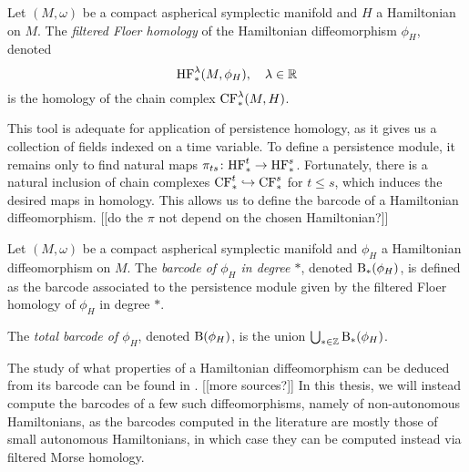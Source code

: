 \begin{definition}
Let $(M,\omega)$ be a compact aspherical symplectic manifold and $H$ a Hamiltonian on $M$. The \emph{filtered Floer homology} of the Hamiltonian diffeomorphism $\phi_H$, denoted
\begin{equation}
\mathrm{HF}^\lambda_*(M,\phi_H), \quad \lambda \in \mathbb{R}
\end{equation}
is the homology of the chain complex $\mathrm{CF}^\lambda_*(M,H)$.
\end{definition}

This tool is adequate for application of persistence homology, as it gives us a collection of fields indexed on a time variable. To define a persistence module, it remains only to find natural maps $\pi_{ts} \colon \mathrm{HF}^t_* \to \mathrm{HF}^s_*$. Fortunately, there is a natural inclusion of chain complexes $\mathrm{CF}^t_* \hookrightarrow \mathrm{CF}^s_*$ for $t \leq s$, which induces the desired maps in homology. This allows us to define the barcode of a Hamiltonian diffeomorphism. [[do the $\pi$ not depend on the chosen Hamiltonian?]]

\begin{definition}
Let $(M,\omega)$ be a compact aspherical symplectic manifold and $\phi_H$ a Hamiltonian diffeomorphism on $M$. The \emph{barcode of $\phi_H$ in degree $*$}, denoted $\mathrm{B}_*(\phi_H)$, is defined as the barcode associated to the persistence module given by the filtered Floer homology of $\phi_H$ in degree $*$.

The \emph{total barcode of $\phi_H$}, denoted $\mathrm{B}(\phi_H)$, is the union $\bigcup_{* \in \mathbb{Z}} \mathrm{B}_*(\phi_H)$.
\end{definition}

The study of what properties of a Hamiltonian diffeomorphism can be deduced from its barcode can be found in \cite{polterovich}. [[more sources?]] In this thesis, we will instead compute the barcodes of a few such diffeomorphisms, namely of non-autonomous Hamiltonians, as the barcodes computed in the literature are mostly those of small autonomous Hamiltonians, in which case they can be computed instead via filtered Morse homology.